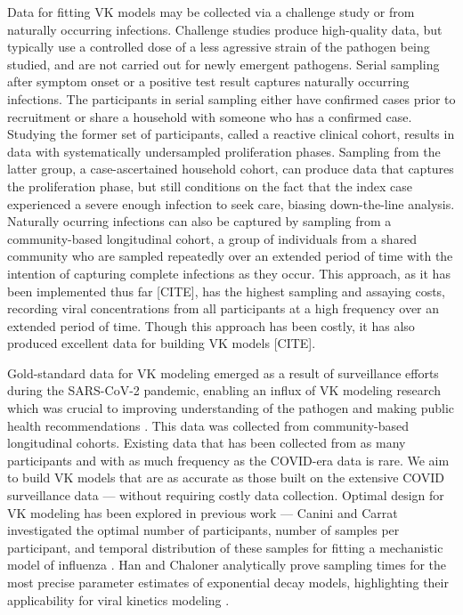 \documentclass[11pt,notitlepage]{article}
\begin{document}
Data for fitting VK models may be collected via a challenge study or from naturally occurring infections.
Challenge studies produce high-quality data, but typically use a controlled dose of a less agressive strain of the pathogen being studied, and are not carried out for newly emergent pathogens.
Serial sampling after symptom onset or a positive test result captures naturally occurring infections.
The participants in serial sampling either have confirmed cases prior to recruitment or share a household with someone who has a confirmed case.
Studying the former set of participants, called a reactive clinical cohort, results in data with systematically undersampled proliferation phases.
Sampling from the latter group, a case-ascertained household cohort, can produce data that captures the proliferation phase, but still conditions on the fact that the index case experienced a severe enough infection to seek care, biasing down-the-line analysis.
Naturally ocurring infections can also be captured by sampling from a community-based longitudinal cohort, a group of individuals from a shared community who are sampled repeatedly over an extended period of time with the intention of capturing complete infections as they occur.
This approach, as it has been implemented thus far [CITE], has the highest sampling and assaying costs, recording viral concentrations from all participants at a high frequency over an extended period of time.
Though this approach has been costly, it has also produced excellent data for building VK models [CITE].

Gold-standard data for VK modeling emerged as a result of surveillance efforts during the SARS-CoV-2 pandemic, enabling an influx of VK modeling research which was crucial to improving understanding of the pathogen and making public health recommendations \cite{singanayagam2022community,kissler2021viral,ke2022longitudinal}.
This data was collected from community-based longitudinal cohorts.
Existing data that has been collected from as many participants and with as much frequency as the COVID-era data is rare.
We aim to build VK models that are as accurate as those built on the extensive COVID surveillance data — without requiring costly data collection.
Optimal design for VK modeling has been explored in previous work — Canini and Carrat investigated the optimal number of participants, number of samples per participant, and temporal distribution of these samples for fitting a mechanistic model of influenza \cite{canini2011viral}.
Han and Chaloner analytically prove sampling times for the most precise parameter estimates of exponential decay models, highlighting their applicability for viral kinetics modeling \cite{han2003d}.
\end{document}
